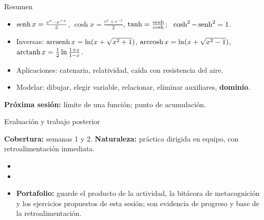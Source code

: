 \documentclass[10pt,aspectratio=169]{beamer}
\begin{document}
\begin{frame}{Resumen}
  \begin{itemize}
    \item $\operatorname{senh} x=\frac{e^x-e^{-x}}2$, $\cosh x=\frac{e^x+e^{-x}}2$, $\tanh=\frac{\operatorname{senh}}{\cosh}$; \ $\cosh^2-\operatorname{senh}^2=1$.
    \item Inversas: $\operatorname{arcsenh} x=\ln(x+\sqrt{x^2+1})$, $\operatorname{arccosh} x=\ln(x+\sqrt{x^2-1})$, $\operatorname{arctanh} x=\frac12\ln\frac{1+x}{1-x}$.
    \item Aplicaciones: catenaria, relatividad, caída con resistencia del aire.
    \item Modelar: dibujar, elegir variable, relacionar, eliminar auxiliares, \textbf{dominio}.
  \end{itemize}
  \vspace{3mm}
  \textbf{Próxima sesión:} límite de una función; punto de acumulación.
\end{frame}


\begin{frame}{Evaluación y trabajo posterior}
  \small
  \begin{evalbox}
    \textbf{Cobertura:} semanas 1 y 2. \textbf{Naturaleza:} práctica dirigida en equipo, con retroalimentación inmediata.
  \end{evalbox}
  \begin{itemize}
    \item \criterios
    \item \declaracionia
    \item \textbf{Portafolio:} guarde el producto de la actividad, la bitácora de metacognición y los ejercicios propuestos de esta sesión; son evidencia de progreso y base de la retroalimentación.
  \end{itemize}
\end{frame}
\end{document}
